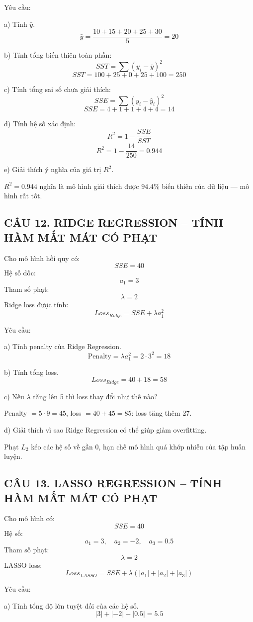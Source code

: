 \documentclass[a4paper,12pt]{article}
\begin{document}
Yêu cầu:

a) Tính $\bar{y}$.
\[ \bar{y} = \frac{10 + 15 + 20 + 25 + 30}{5} = 20 \]

b) Tính tổng biến thiên toàn phần:
\[ SST = \sum(y_i - \bar{y})^2 \]
\[ SST = 100 + 25 + 0 + 25 + 100 = 250 \]

c) Tính tổng sai số chưa giải thích:
\[ SSE = \sum(y_i - \hat{y}_i)^2 \]
\[ SSE = 4 + 1 + 1 + 4 + 4 = 14 \]

d) Tính hệ số xác định:
\[ R^2 = 1 - \frac{SSE}{SST} \]
\[ R^2 = 1 - \frac{14}{250} = 0.944 \]

e) Giải thích ý nghĩa của giá trị $R^2$.

$R^2 = 0.944$ nghĩa là mô hình giải thích được $94.4\%$ biến thiên của dữ liệu —
mô hình rất tốt.

\subsection*{CÂU 12. RIDGE REGRESSION -- TÍNH HÀM MẤT MÁT CÓ PHẠT}

Cho mô hình hồi quy có:
\[ SSE = 40 \]
Hệ số dốc:
\[ a_1 = 3 \]
Tham số phạt:
\[ \lambda = 2 \]
Ridge loss được tính:
\[ Loss_{Ridge} = SSE + \lambda a_1^2 \]

Yêu cầu:

a) Tính penalty của Ridge Regression.
\[ \text{Penalty} = \lambda a_1^2 = 2 \cdot 3^2 = 18 \]

b) Tính tổng loss.
\[ Loss_{Ridge} = 40 + 18 = 58 \]

c) Nếu $\lambda$ tăng lên 5 thì loss thay đổi như thế nào?

Penalty $= 5 \cdot 9 = 45$, loss $= 40 + 45 = 85$: loss tăng thêm 27.

d) Giải thích vì sao Ridge Regression có thể giúp giảm overfitting.

Phạt $L_2$ kéo các hệ số về gần 0, hạn chế mô hình quá khớp nhiễu của tập huấn luyện.

\subsection*{CÂU 13. LASSO REGRESSION -- TÍNH HÀM MẤT MÁT CÓ PHẠT}

Cho mô hình có:
\[ SSE = 40 \]
Hệ số:
\[ a_1 = 3, \quad a_2 = -2, \quad a_3 = 0.5 \]
Tham số phạt:
\[ \lambda = 2 \]
LASSO loss:
\[ Loss_{LASSO} = SSE + \lambda(|a_1| + |a_2| + |a_3|) \]

Yêu cầu:

a) Tính tổng độ lớn tuyệt đối của các hệ số.
\[ |3| + |-2| + |0.5| = 5.5 \]
\end{document}
